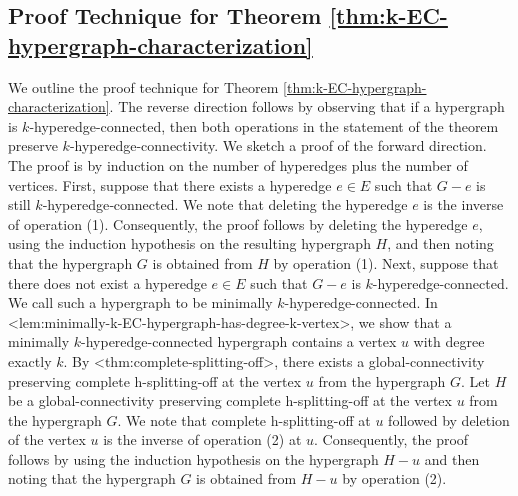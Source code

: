 \documentclass{article}
\def\Cref#1{<#1>}%
\newcommand{\shubhang}[1]{{\color{blue}[{\tiny Shubhang: \bf #1}]\marginpar{\color{blue}*}}}
\begin{document}
\subsection{Proof Technique for Theorem \ref{thm:k-EC-hypergraph-characterization}}
We outline the proof technique for Theorem \ref{thm:k-EC-hypergraph-characterization}. The reverse direction follows by observing that if a hypergraph is $k$-hyperedge-connected, then both operations in the statement of the theorem preserve $k$-hyperedge-connectivity. We sketch a proof of the forward direction. 
The proof is by induction on the number of hyperedges plus the number of vertices. 
First, suppose that there exists a hyperedge $e \in E$ such that $G - e$ is still $k$‐hyperedge‐connected. We note that deleting the hyperedge $e$ is the inverse of operation (1). Consequently, the proof follows by deleting the hyperedge $e$, using the induction hypothesis on the resulting hypergraph $H$, and then noting that the hypergraph $G$ is obtained from $H$ by operation (1). 
Next, suppose that there does not exist a hyperedge $e \in E$ such that $G-e$ is $k$-hyperedge-connected. We call such a hypergraph to be minimally $k$-hyperedge-connected. In \Cref{lem:minimally-k-EC-hypergraph-has-degree-k-vertex}, we show that a minimally $k$-hyperedge-connected hypergraph contains a vertex $u$ with degree exactly $k$. By \Cref{thm:complete-splitting-off}, there exists a global-connectivity preserving complete h-splitting-off at the vertex $u$ from the hypergraph $G$. Let $H$ be a global-connectivity preserving complete h-splitting-off at the vertex $u$ from the hypergraph $G$. 
We note that complete h-splitting-off at $u$ followed by deletion of the vertex $u$ is the inverse of operation (2) at $u$. 
Consequently, the proof follows by using the induction hypothesis on the hypergraph $H-u$ and then noting that the hypergraph $G$ is obtained from $H-u$ by operation (2).

\end{document}
